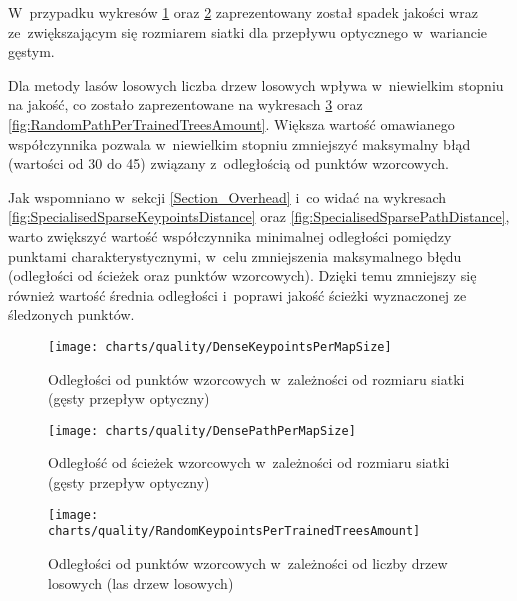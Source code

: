     W~przypadku wykresów \ref{fig:DenseKeypointsPerMapSize} oraz \ref{fig:DensePathPerMapSize} zaprezentowany został spadek jakości wraz ze~zwiększającym się rozmiarem siatki dla przepływu optycznego w~wariancie gęstym.

    Dla metody lasów losowych liczba drzew losowych wpływa w~niewielkim stopniu na jakość, co zostało zaprezentowane na wykresach \ref{fig:RandomKeypointsPerTrainedTreesAmount} oraz \ref{fig:RandomPathPerTrainedTreesAmount}. Większa wartość omawianego współczynnika pozwala w~niewielkim stopniu zmniejszyć maksymalny błąd (wartości od 30 do 45) związany z~odległością od punktów wzorcowych.

    Jak wspomniano w~sekcji \ref{Section_Overhead} i~co widać na wykresach \ref{fig:SpecialisedSparseKeypointsDistance} oraz \ref{fig:SpecialisedSparsePathDistance}, warto zwiększyć wartość współczynnika minimalnej odległości pomiędzy punktami charakterystycznymi, w~celu zmniejszenia maksymalnego błędu (odległości od ścieżek oraz punktów wzorcowych). Dzięki temu zmniejszy się również wartość średnia odległości i~poprawi jakość ścieżki wyznaczonej ze śledzonych punktów.

      \begin{figure}[!ht]
        \centering
        \texttt{[image: charts/quality/DenseKeypointsPerMapSize]}
        \caption[Odległości od punktów wzorcowych w~zależności od rozmiaru siatki]
                {Odległości od punktów wzorcowych w~zależności od rozmiaru siatki (gęsty przepływ optyczny)}
        \label{fig:DenseKeypointsPerMapSize}
      \end{figure}

      \begin{figure}[!ht]
        \centering
        \texttt{[image: charts/quality/DensePathPerMapSize]}
        \caption[Odległość od ścieżek wzorcowych w~zależności od rozmiaru siatki]
                {Odległość od ścieżek wzorcowych w~zależności od rozmiaru siatki (gęsty przepływ optyczny)}
        \label{fig:DensePathPerMapSize}
      \end{figure}

      \begin{figure}[!ht]
        \centering
        \texttt{[image: charts/quality/RandomKeypointsPerTrainedTreesAmount]}
        \caption[Odległości od punktów wzorcowych w~zależności od liczby drzew losowych]
                {Odległości od punktów wzorcowych w~zależności od liczby drzew losowych (las drzew losowych)}
        \label{fig:RandomKeypointsPerTrainedTreesAmount}
      \end{figure}

